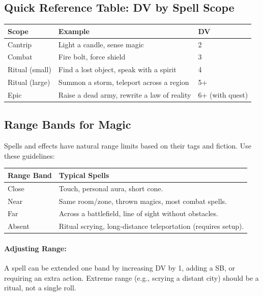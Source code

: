 \subsection*{Quick Reference Table: DV by Spell Scope}
\label{subsec:dv-spell-scope}
\begin{center}
\begin{tabular}{lll}
\toprule
\textbf{Scope} & \textbf{Example} & \textbf{DV} \\
\midrule
Cantrip & Light a candle, sense magic & 2 \\
Combat & Fire bolt, force shield & 3 \\
Ritual (small) & Find a lost object, speak with a spirit & 4 \\
Ritual (large) & Summon a storm, teleport across a region & 5+ \\
Epic & Raise a dead army, rewrite a law of reality & 6+ (with quest) \\
\bottomrule
\end{tabular}
\end{center}

\subsection*{Range Bands for Magic}
Spells and effects have natural range limits based on their tags and fiction. Use these guidelines:

\begin{center}
\begin{tabular}{ll}
\toprule
\textbf{Range Band} & \textbf{Typical Spells} \\
\midrule
Close & Touch, personal aura, short cone. \\
Near & Same room/zone, thrown magics, most combat spells. \\
Far & Across a battlefield, line of sight without obstacles. \\
Absent & Ritual scrying, long‑distance teleportation (requires setup). \\
\bottomrule
\end{tabular}
\end{center}

\paragraph{Adjusting Range:} A spell can be extended one band by increasing DV by 1, adding a SB, or requiring an extra action. Extreme range (e.g., scrying a distant city) should be a ritual, not a single roll.

